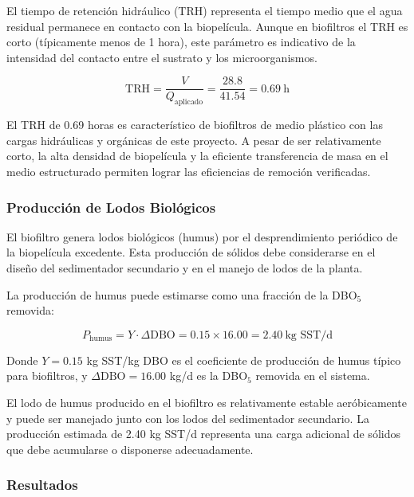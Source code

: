 \documentclass[12pt,a4paper]{article}
\begin{document}
El tiempo de retención hidráulico (TRH) representa el tiempo medio que el agua residual permanece en contacto con la biopelícula. Aunque en biofiltros el TRH es corto (típicamente menos de 1 hora), este parámetro es indicativo de la intensidad del contacto entre el sustrato y los microorganismos.

\begin{equation}
\text{TRH} = \frac{V}{Q_{\text{aplicado}}} = \frac{28.8}{41.54} = 0.69\ \text{h}
\end{equation}

El TRH de 0.69 horas es característico de biofiltros de medio plástico con las cargas hidráulicas y orgánicas de este proyecto. A pesar de ser relativamente corto, la alta densidad de biopelícula y la eficiente transferencia de masa en el medio estructurado permiten lograr las eficiencias de remoción verificadas.

\subsubsection*{Producción de Lodos Biológicos}

El biofiltro genera lodos biológicos (humus) por el desprendimiento periódico de la biopelícula excedente. Esta producción de sólidos debe considerarse en el diseño del sedimentador secundario y en el manejo de lodos de la planta.

La producción de humus puede estimarse como una fracción de la DBO$_5$ removida:

\begin{equation}
P_{\text{humus}} = Y \cdot \Delta\text{DBO} = 0.15 \times 16.00 = 2.40\ \text{kg SST/d}
\end{equation}

Donde $Y = 0.15$ kg SST/kg DBO es el coeficiente de producción de humus típico para biofiltros, y $\Delta\text{DBO} = 16.00$ kg/d es la DBO$_5$ removida en el sistema.

El lodo de humus producido en el biofiltro es relativamente estable aeróbicamente y puede ser manejado junto con los lodos del sedimentador secundario. La producción estimada de 2.40 kg SST/d representa una carga adicional de sólidos que debe acumularse o disponerse adecuadamente.

\subsubsection{Resultados}
\end{document}
